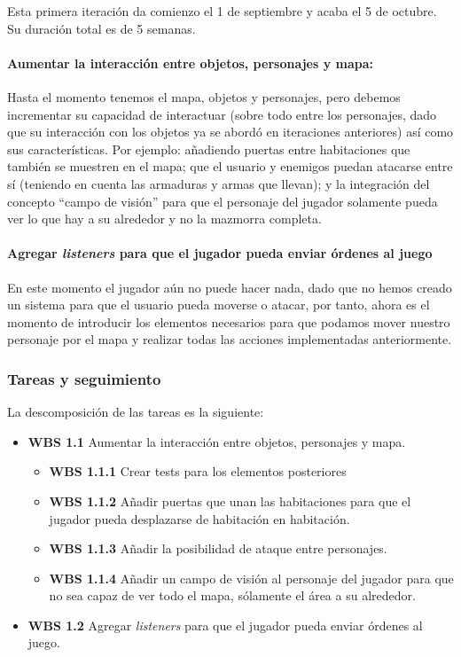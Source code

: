 Esta primera iteración da comienzo el 1 de septiembre y acaba el 5 de octubre. Su duración total es de 5 semanas.

\paragraph{Aumentar la interacción entre objetos, personajes y mapa:} Hasta el momento tenemos el mapa, objetos y personajes, pero debemos incrementar su capacidad de interactuar (sobre todo entre los personajes, dado que su interacción con los objetos ya se abordó en iteraciones anteriores) así como sus características. Por ejemplo: añadiendo puertas entre habitaciones que también se muestren en el mapa; que el usuario y enemigos puedan atacarse entre sí (teniendo en cuenta las armaduras y armas que llevan); y la integración del concepto ``campo de visión'' para que el personaje del jugador solamente pueda ver lo que hay a su alrededor y no la mazmorra completa.

\paragraph{Agregar \textit{listeners} para que el jugador pueda enviar órdenes al juego} En este momento el jugador aún no puede hacer nada, dado que no hemos creado un sistema para que el usuario pueda moverse o atacar, por tanto, ahora es el momento de introducir los elementos necesarios para que podamos mover nuestro personaje por el mapa y realizar todas las acciones implementadas anteriormente.

\subsubsection{Tareas y seguimiento}

La descomposición de las tareas es la siguiente:

\begin{itemize}
  \item \textbf{WBS 1.1} Aumentar la interacción entre objetos, personajes y mapa.
    \begin{itemize}
      \item \textbf{WBS 1.1.1} Crear tests para los elementos posteriores
      \item \textbf{WBS 1.1.2} Añadir puertas que unan las habitaciones para que el jugador pueda desplazarse de habitación en habitación.
      \item \textbf{WBS 1.1.3} Añadir la posibilidad de ataque entre personajes.
      \item \textbf{WBS 1.1.4} Añadir un campo de visión al personaje del jugador para que no sea capaz de ver todo el mapa, sólamente el área a su alrededor.
    \end{itemize}
  \item \textbf{WBS 1.2} Agregar \textit{listeners} para que el jugador pueda enviar órdenes al juego.
\end{itemize}

